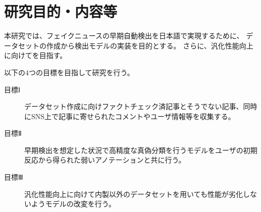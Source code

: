 
\section{研究目的・内容等}

\vspace{20pt}
本研究では、フェイクニュースの早期自動検出を日本語で実現するために、
データセットの作成から検出モデルの実装を目的とする。
さらに、汎化性能向上に向けてを目指す。

以下の4つの目標を目指して研究を行う。
\begin{description}
    \item[目標Ⅰ] データセット作成に向けファクトチェック済記事とそうでない記事、同時にSNS上で記事に寄せられたコメントやユーザ情報等を収集する。
    \item[目標Ⅱ] 早期検出を想定した状況で高精度な真偽分類を行うモデルをユーザの初期反応から得られた弱いアノテーションと共に行う。
    \item[目標Ⅲ] 汎化性能向上に向けて内製以外のデータセットを用いても性能が劣化しないようモデルの改変を行う。
\end{description}


